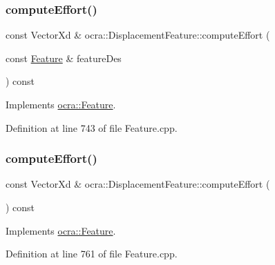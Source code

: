 \subsubsection{\texorpdfstring{compute\+Effort()}{computeEffort()}\hspace{0.1cm}{\footnotesize\ttfamily [1/2]}}
{\footnotesize\ttfamily const Vector\+Xd \& ocra\+::\+Displacement\+Feature\+::compute\+Effort (\begin{DoxyParamCaption}\item[{const \hyperlink{classocra_1_1Feature}{Feature} \&}]{feature\+Des }\end{DoxyParamCaption}) const\hspace{0.3cm}{\ttfamily [virtual]}}



Implements \hyperlink{classocra_1_1Feature_a19626a241666fdae253af1f7b6f2acd7}{ocra\+::\+Feature}.



Definition at line 743 of file Feature.\+cpp.

\hypertarget{classocra_1_1DisplacementFeature_aee1c2f5af98c28e8d6ab3dbeb5c3c297}{}\label{classocra_1_1DisplacementFeature_aee1c2f5af98c28e8d6ab3dbeb5c3c297} 
\subsubsection{\texorpdfstring{compute\+Effort()}{computeEffort()}\hspace{0.1cm}{\footnotesize\ttfamily [2/2]}}
{\footnotesize\ttfamily const Vector\+Xd \& ocra\+::\+Displacement\+Feature\+::compute\+Effort (\begin{DoxyParamCaption}{ }\end{DoxyParamCaption}) const\hspace{0.3cm}{\ttfamily [virtual]}}



Implements \hyperlink{classocra_1_1Feature_ae43f2ffc54862d6ddc0b02fd39431eb6}{ocra\+::\+Feature}.



Definition at line 761 of file Feature.\+cpp.

\hypertarget{classocra_1_1DisplacementFeature_a61d1caacf56e60bb3f33d2c91d5b89f2}{}\label{classocra_1_1DisplacementFeature_a61d1caacf56e60bb3f33d2c91d5b89f2} 
